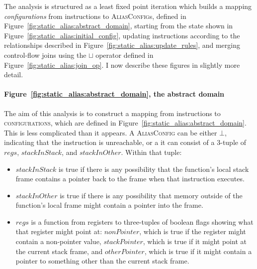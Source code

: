The analysis is structured as a least fixed point iteration which
builds a mapping \textit{configurations} from instructions to
\textsc{AliasConfig}s, defined in
Figure~\ref{fig:static_alias:abstract_domain}, starting from the state shown in
Figure~\ref{fig:static_alias:initial_config}, updating instructions
according to the relationships described in
Figure~\ref{fig:static_alias:update_rules}, and merging control-flow
joins using the $\sqcup$ operator defined in
Figure~\ref{fig:static_alias:join_op}.  I now describe these figures
in slightly more detail.

\paragraph{Figure~\ref{fig:static_alias:abstract_domain}, the abstract domain}

The aim of this analysis is to construct a mapping from instructions
to \textsc{configurations}, which are defined in
Figure~\ref{fig:static_alias:abstract_domain}.  This is less
complicated than it appears.  A \textsc{AliasConfig} can be either
$\bot$, indicating that the instruction is unreachable, or a it can
consist of a 3-tuple of $\mathit{regs}$, $\mathit{stackInStack}$, and
$\mathit{stackInOther}$.  Within that tuple:

\begin{itemize}
\item $\mathit{stackInStack}$ is true if there is any possibility that
  the function's local stack frame contains a pointer back to the
  frame when that instruction executes.
\item $\mathit{stackInOther}$ is true if there is any possibility that
  memory outside of the function's local frame might contain a pointer
  into the frame.
\item $\mathit{regs}$ is a function from registers to three-tuples of
  boolean flags showing what that register might point at:
  $\mathit{nonPointer}$, which is true if the register might contain a
  non-pointer value, $\mathit{stackPointer}$, which is true if it
  might point at the current stack frame, and $\mathit{otherPointer}$,
  which is true if it might contain a pointer to something other than
  the current stack frame.
\end{itemize}

